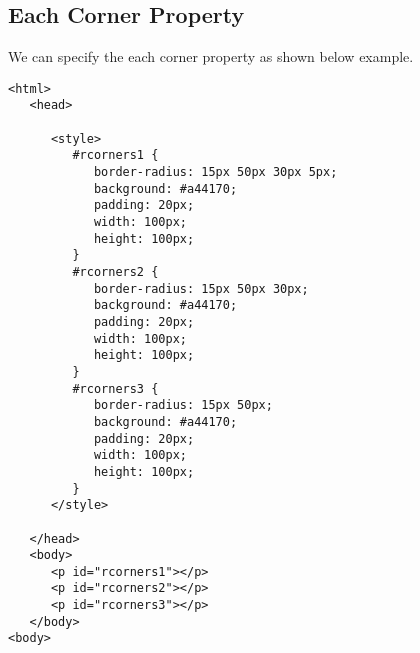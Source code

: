 \documentclass[a4paper,oneside]{book}
\numberwithin{equation}{chapter}
\begin{document}
\subsection{Each Corner Property}
We can specify the each corner property as shown below example.
\begin{verbatim}
<html>
   <head>
   
      <style>
         #rcorners1 {
            border-radius: 15px 50px 30px 5px;
            background: #a44170;
            padding: 20px; 
            width: 100px;
            height: 100px; 
         }
         #rcorners2 {
            border-radius: 15px 50px 30px;
            background: #a44170;
            padding: 20px;
            width: 100px;
            height: 100px; 
         }
         #rcorners3 {
            border-radius: 15px 50px;
            background: #a44170;
            padding: 20px; 
            width: 100px;
            height: 100px; 
         }
      </style>
      
   </head>
   <body>
      <p id="rcorners1"></p>
      <p id="rcorners2"></p>
      <p id="rcorners3"></p>
   </body>
<body>
\end{verbatim}
\end{document}
